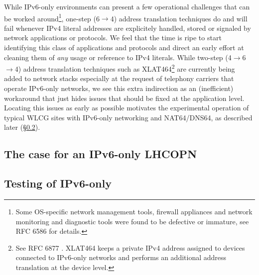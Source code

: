 While IPv6-only environments can present a few operational challenges that
can be worked around\footnote{Some OS-specific network management tools,
firewall appliances and network monitoring and diagnostic tools were found
to be defective or immature, see RFC 6586 \cite{rfc} for details.},
one-step (6$\rightarrow$4) address translation techniques do and will fail whenever 
IPv4 literal addresses are explicitely handled, stored or signaled by
network applications or protocols. We feel that the time is ripe to
start identifying this class of applications and protocols and direct an early effort
at cleaning them of {\it any} usage or reference to IPv4 literals. While 
two-step (4$\rightarrow$6$\rightarrow$4) address translation techniques
such as XLAT464\footnote{See RFC 6877 \cite{rfc}. XLAT464 keeps a private
IPv4 address assigned to devices connected to IPv6-only networks and
performs an additional address translation at the device level.}
are currently being added to 
network stacks especially at the request of telephony carriers that operate
IPv6-only networks, we see this extra indirection as an (inefficient)
workaround that just hides issues that should be fixed at the application
level. Locating this issues as early as possible motivates the experimental
operation of typical
WLCG sites with IPv6-only networking and NAT64/DNS64, as described
later (\S \ref{ssec:ipv6onlytest}).

\subsection{The case for an IPv6-only LHCOPN}


\subsection{Testing of IPv6-only}
\label{ssec:ipv6onlytest}


